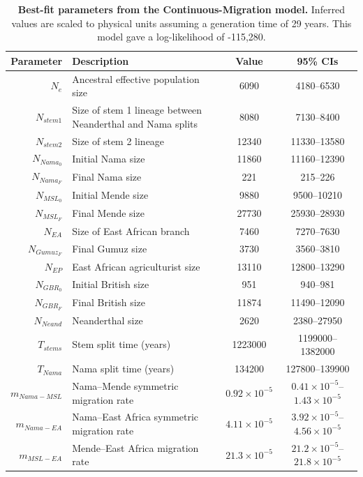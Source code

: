 \documentclass[]{article}
\begin{document}
\begin{table}[ht]
\caption{
    \label{tab:supp-continuous-migration}
    \textbf{Best-fit parameters from the Continuous-Migration model.}
    Inferred values are scaled to physical units assuming a generation time of
    29 years. This model gave a log-likelihood of -115,280.
}
\centering
\begin{tabular}[t]{rP{8cm}cc}
    \toprule
    Parameter & Description & Value & 95\% CIs\\
    \midrule
    $N_e$ & Ancestral effective population size & 6090 & 4180--6530 \\
    $N_{stem1}$ & Size of stem 1 lineage between Neanderthal and Nama splits & 8080 & 7130--8400 \\
    $N_{stem2}$ & Size of stem 2 lineage & 12340 & 11330--13580 \\
    $N_{Nama_0}$ & Initial Nama size & 11860 & 11160--12390 \\
    $N_{Nama_F}$ & Final Nama size & 221 & 215--226 \\
    $N_{MSL_0}$ & Initial Mende size & 9880 & 9500--10210 \\
    $N_{MSL_F}$ & Final Mende size & 27730 & 25930--28930 \\
    $N_{EA}$ & Size of East African branch & 7460 & 7270--7630 \\
    $N_{Gumuz_F}$ & Final Gumuz size & 3730 & 3560--3810 \\
    $N_{EP}$ & East African agriculturist size & 13110 & 12800--13290 \\
    $N_{GBR_0}$ & Initial British size & 951 & 940--981 \\
    $N_{GBR_F}$ & Final British size & 11874 & 11490--12090 \\
    $N_{Neand}$ & Neanderthal size & 2620 & 2380--27950 \\
    $T_{stems}$ & Stem split time (years) & 1223000 & 1199000--1382000 \\
    $T_{Nama}$ & Nama split time (years) & 134200 & 127800--139900 \\
    $m_{Nama-MSL}$ & Nama--Mende symmetric migration rate & $0.92\times10^{-5}$ & $0.41\times10^{-5}$--$1.43\times10^{-5}$ \\
    $m_{Nama-EA}$ & Nama--East Africa symmetric migration rate & $4.11\times10^{-5}$ & $3.92\times10^{-5}$--$4.56\times10^{-5}$ \\
    $m_{MSL-EA}$ & Mende--East Africa migration rate & $21.3\times10^{-5}$ & $21.2\times10^{-5}$--$21.8\times10^{-5}$ \\

\end{tabular}
\end{table}
\end{document}
